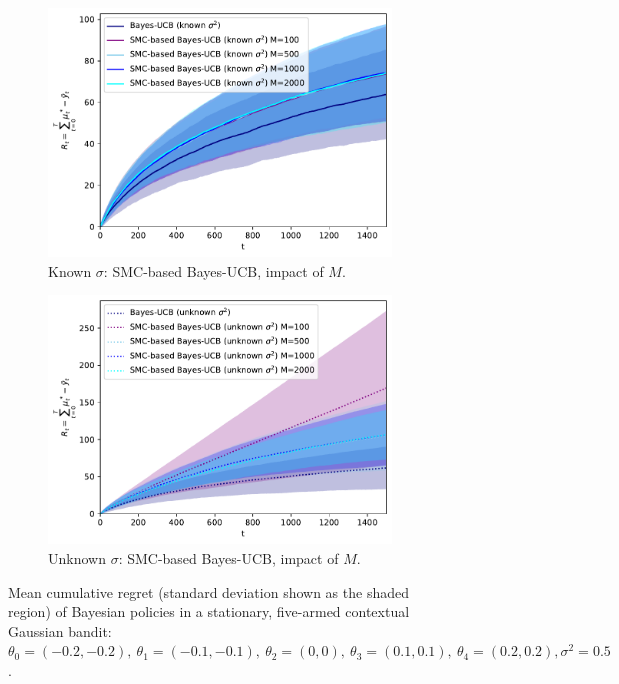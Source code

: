 \begin{figure}[!h]
	\begin{subfigure}[b]{0.46\textwidth}
		\centering
		\includegraphics[width=\textwidth]{./fods_figs/static/linear_gaussian/A5/theta-0.2_-0.2_-0.1_-0.1_0._0._0.1_0.1_0.2_0.2_sigma0.5_0.5_0.5_0.5_0.5_allM_cumulative_regret_bucb_knownsigma}
		\caption{Known $\sigma$: SMC-based Bayes-UCB, impact of $M$.}
	\end{subfigure}
	\begin{subfigure}[b]{0.46\textwidth}
		\centering
		\includegraphics[width=\textwidth]{./fods_figs/static/linear_gaussian/A5/theta-0.2_-0.2_-0.1_-0.1_0._0._0.1_0.1_0.2_0.2_sigma0.5_0.5_0.5_0.5_0.5_allM_cumulative_regret_bucb_unknownsigma}
		\caption{Unknown $\sigma$: SMC-based Bayes-UCB, impact of $M$.}
	\end{subfigure}
	
	\caption{Mean cumulative regret (standard deviation shown as the shaded region) of Bayesian policies in a stationary, five-armed contextual Gaussian bandit: $\theta_0=(-0.2,-0.2), \ \theta_1=(-0.1,-0.1), \ \theta_2=(0,0), \ \theta_3=(0.1,0.1), \ \theta_4=(0.2,0.2), \sigma^2=0.5$.}
\end{figure}